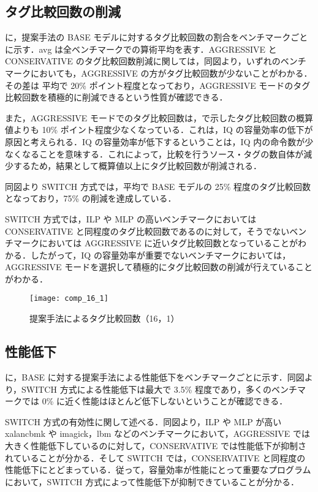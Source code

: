 \subsection{タグ比較回数の削減}
に，提案手法の BASE モデルに対するタグ比較回数の割合をベンチマークごとに示す．avg は全ベンチマークでの算術平均を表す．AGGRESSIVE と CONSERVATIVE のタグ比較回数削減に関しては，同図より，いずれのベンチマークにおいても，AGGRESSIVE の方がタグ比較回数が少ないことがわかる．その差は 平均で 20\% ポイント程度となっており，AGGRESSIVE モードのタグ比較回数を積極的に削減できるという性質が確認できる．

また，AGGRESSIVE モードでのタグ比較回数は，で示したタグ比較回数の概算値よりも 10\% ポイント程度少なくなっている．これは，IQ の容量効率の低下が原因と考えられる．IQ の容量効率が低下するということは，IQ 内の命令数が少なくなることを意味する．これによって，比較を行うソース・タグの数自体が減少するため，結果として概算値以上にタグ比較回数が削減される．

同図より SWITCH 方式では，平均で BASE モデルの 25\% 程度のタグ比較回数となっており，75\% の削減を達成している．

SWITCH 方式では，ILP や MLP の高いベンチマークにおいては CONSERVATIVE と同程度のタグ比較回数であるのに対して，そうでないベンチマークにおいては AGGRESSIVE に近いタグ比較回数となっていることがわかる．したがって，IQ の容量効率が重要でないベンチマークにおいては，AGGRESSIVE モードを選択して積極的にタグ比較回数の削減が行えていることがわかる．

\begin{figure}[htb]
  \centering
  \texttt{[image: comp\_16\_1]}
  \caption{提案手法によるタグ比較回数（16，1）}
  \label{fig:comp_16_1}
\end{figure}

\subsection{性能低下}
に，BASE に対する提案手法による性能低下をベンチマークごとに示す．同図より，SWITCH 方式による性能低下は最大で 3.5\% 程度であり，多くのベンチマークでは 0\% に近く性能はほとんど低下しないということが確認できる．

SWITCH 方式の有効性に関して述べる．同図より，ILP や MLP が高い xalancbmk や imagick，lbm などのベンチマークにおいて，AGGRESSIVE では大きく性能低下しているのに対して，CONSERVATIVE では性能低下が抑制されていることが分かる．そして SWITCH では，CONSERVATIVE と同程度の性能低下にとどまっている．従って，容量効率が性能にとって重要なプログラムにおいて，SWITCH 方式によって性能低下が抑制できていることが分かる．

